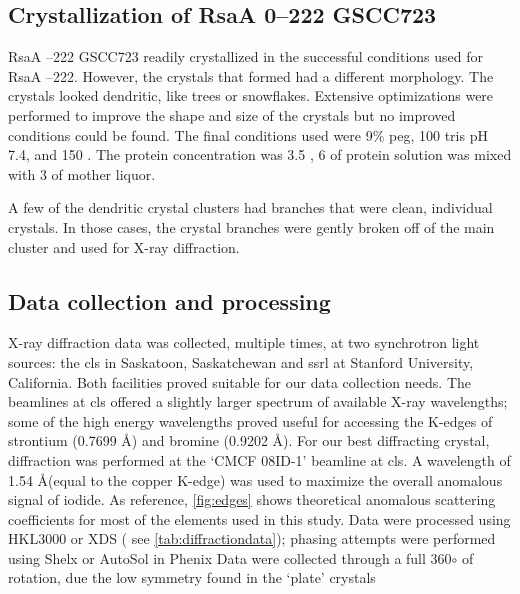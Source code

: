 \subsection{Crystallization of RsaA \del{}0--222 GSCC723} \label{sec:cryst-rsaa-del0}

RsaA --222 GSCC723 readily crystallized in the successful conditions used for RsaA --222. However, the crystals that formed had a different morphology. The crystals looked dendritic, like trees or snowflakes. Extensive optimizations were performed to improve the shape and size of the crystals but no improved conditions could be found. The final conditions used were 9\% \ac{peg}, 100 \millimolar{} tris pH 7.4, and 150 \millimolar{} . The protein concentration was 3.5 \mgperml{}, 6 \microlitre{} of protein solution was mixed with 3 \microlitre{} of mother liquor. 

A few of the dendritic crystal clusters had branches that were clean, individual crystals. In those cases, the crystal branches were gently broken off of the main cluster and used for X-ray diffraction.


\subsection{Data collection and processing}\label{sec:crystal-data-collection}
X-ray diffraction data was collected, multiple times, at two synchrotron light
sources: the \ac{cls} in Saskatoon, Saskatchewan and \ac{ssrl} at Stanford
University, California. Both facilities proved suitable for our data collection
needs. The beamlines at \ac{cls} offered a slightly larger spectrum of available
X-ray wavelengths; some of the high energy wavelengths proved useful for
accessing the K-edges of strontium (0.7699 \AA) and bromine (0.9202 \AA). For
our best diffracting crystal, diffraction was performed at the `CMCF 08ID-1'
beamline at \ac{cls}. A wavelength of 1.54 \AA (equal to the copper K-edge) was
used to maximize the overall anomalous signal of iodide.  As
reference, \cref{fig:edges} shows theoretical anomalous scattering coefficients
for most of the elements used in this study. Data were processed using
HKL3000 or XDS ( see
\cref{tab:diffractiondata}); phasing attempts were performed using
Shelx or AutoSol in
Phenix Data were collected through a full
360$\circ$ of rotation, due the low symmetry found in the `plate' crystals

